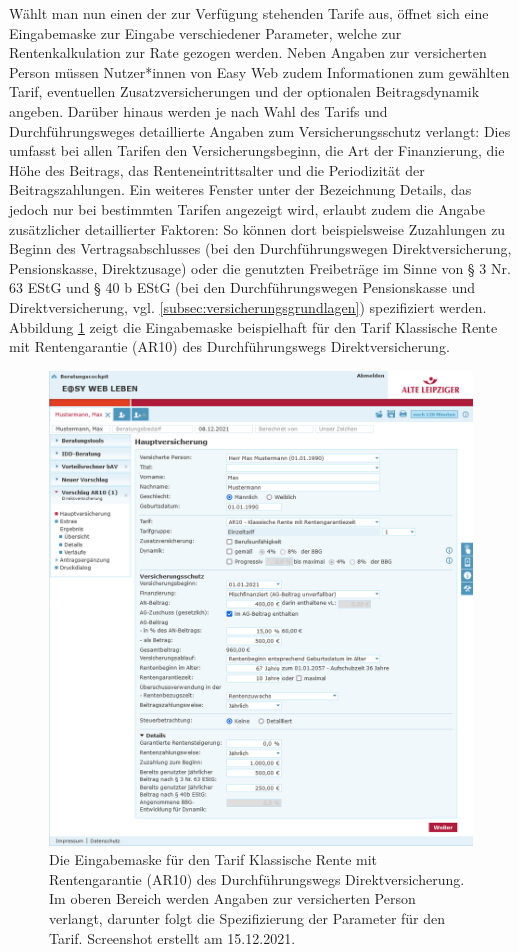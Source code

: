 Wählt man nun einen der zur Verfügung stehenden Tarife aus, öffnet sich eine Eingabemaske zur Eingabe verschiedener Parameter, welche zur Rentenkalkulation zur Rate gezogen werden. Neben Angaben zur versicherten Person müssen Nutzer*innen von Easy Web zudem Informationen zum gewählten Tarif, eventuellen Zusatzversicherungen und der optionalen Beitragsdynamik angeben. Darüber hinaus werden je nach Wahl des Tarifs und Durchführungsweges detaillierte Angaben zum Versicherungsschutz verlangt: Dies umfasst bei allen Tarifen den Versicherungsbeginn, die Art der Finanzierung, die Höhe des Beitrags, das Renteneintrittsalter und die Periodizität der Beitragszahlungen. Ein weiteres Fenster unter der Bezeichnung \glqq Details\grqq{}, das jedoch nur bei bestimmten Tarifen angezeigt wird, erlaubt zudem die Angabe zusätzlicher detaillierter Faktoren: So können dort beispielsweise Zuzahlungen zu Beginn des Vertragsabschlusses (bei den Durchführungswegen Direktversicherung, Pensionskasse, Direktzusage) oder die genutzten Freibeträge im Sinne von § 3 Nr. 63 EStG und § 40 b EStG (bei den Durchführungswegen Pensionskasse und Direktversicherung, vgl. \autoref{subsec:versicherungsgrundlagen}) spezifiziert werden. Abbildung \ref{fig:easyWebEingabe} zeigt die Eingabemaske beispielhaft für den Tarif \glqq Klassische Rente mit Rentengarantie (AR10)\grqq{} des Durchführungswegs Direktversicherung.

\begin{figure}[!h]
\centering
\includegraphics[width=0.72\columnwidth]{images/Easy_Web_Eingabe.png}
\caption{Die Eingabemaske für den Tarif \glqq Klassische Rente mit Rentengarantie (AR10)\grqq{} des Durchführungswegs Direktversicherung. Im oberen Bereich werden Angaben zur versicherten Person verlangt, darunter folgt die Spezifizierung der Parameter für den Tarif. Screenshot erstellt am 15.12.2021.}
\label{fig:easyWebEingabe}
\end{figure}

